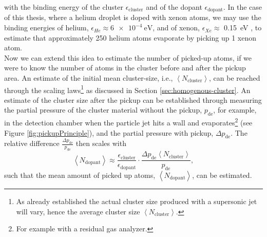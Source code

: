 with the binding energy of the cluster $\epsilon_{\text{cluster}}$ and of the dopant $\epsilon_{\text{dopant}}$. In the case of this thesis, where a helium droplet is doped with xenon atoms, we may use the binding energies of helium, $\epsilon_{He}\approx \SI{6e-4}{\electronvolt}$, and of xenon, $\epsilon_{Xe}\approx$ \SI{0.15}{\electronvolt} \citep{Gomez-2011-JCP,Gomez-2014-Science}, to estimate that approximately 250 helium atoms evaporate by picking up 1 xenon atom.\\[1\baselineskip]
%
Now we can extend this idea to estimate the number of picked-up atoms, if we were to know the number of atoms in the cluster before and after the pickup area. An estimate of the initial mean cluster-size, i.e., $\left\langle N_{\text{cluster}}\right\rangle$, can be reached through the scaling laws\footnote{As already established the actual cluster size produced with a supersonic jet will vary, hence the average cluster size $\left\langle N_{\text{cluster}}\right\rangle$.} as discussed in Section \ref{sec:homogenous-cluster}. An estimate of the cluster size after the pickup can be established through measuring the partial pressure of the cluster material without the pickup, $p_{\text{de}}$, for example, in the detection chamber when the particle jet hits a wall and evaporates\footnote{For example with a residual gas analyzer.} (see Figure \ref{fig:pickupPrinciple}), and the partial pressure with pickup, $\Delta p_{\text{de}}$. The relative difference $\tfrac{\Delta p_{\text{de}}}{p_{\text{de}}}$ then scales with
\begin{equation}
\left\langle N_{\text{dopant}}\right\rangle \approx \frac{\epsilon_{\text{cluster}}}{\epsilon_{\text{dopant}}} \cdot \frac{\Delta p_{\text{de}} \left\langle N_{\text{cluster}}\right\rangle}{p_{\text{de}}},
\label{eq:average-dopant}
\end{equation}
such that the mean amount of picked up atoms, $\left\langle N_{\text{dopant}}\right\rangle$, can be estimated.
%
